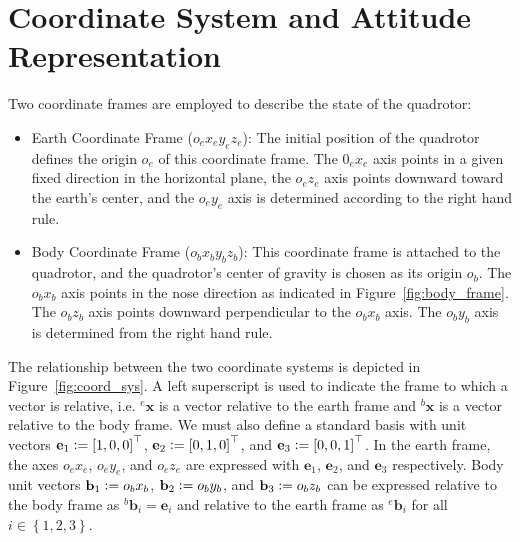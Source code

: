 \documentclass{article}
\author{Philip Renkert}
\date{6/15/2021}
\newcommand{\defeq}{\vcentcolon=}
\begin{document}
 
	\section*{Coordinate System and Attitude Representation}
	Two coordinate frames are employed to describe the state of the quadrotor:
	\begin{itemize}
		\item Earth Coordinate Frame ($o_e x_e y_e z_e$): The initial position of the quadrotor defines the origin $o_e$ of this coordinate frame.  The $0_e x_e$ axis points in a given fixed direction in the horizontal plane, the $o_e z_e$ axis points downward toward the earth's center, and the $o_e y_e$ axis is determined according to the right hand rule.  
		\item Body Coordinate Frame ($o_b x_b y_b z_b$): This coordinate frame is attached to the quadrotor, and the quadrotor's center of gravity is chosen as its origin $o_b$. The $o_bx_b$ axis points in the nose direction as indicated in Figure~\ref{fig:body_frame}.  The $o_b z_b$ axis points downward perpendicular to the $o_b x_b$ axis.  The $o_b y_b$ axis is determined from the right hand rule.  
	\end{itemize}
	
	The relationship between the two coordinate systems is depicted in Figure~\ref{fig:coord_sys}.  A left superscript is used to indicate the frame to which a vector is relative, i.e. ${}^e \mathbf{x}$ is a vector relative to the earth frame and ${}^b \mathbf{x}$ is a vector relative to the body frame.  We must also define a standard basis with unit vectors $\mathbf{e}_1 \defeq \left[1,0,0\right]^\top$, $\mathbf{e}_2 \defeq \left[0,1,0\right]^\top$, and $\mathbf{e}_3 \defeq \left[0,0,1\right]^\top$.  In the earth frame, the axes $o_e x_e$, $o_e y_e$, and $o_e z_e$ are expressed with $\mathbf{e}_1$, $\mathbf{e}_2$, and $\mathbf{e}_3$ respectively. Body unit vectors $\mathbf{b}_1 \defeq o_b x_b$, $\mathbf{b}_2 \defeq o_b y_b$, and $\mathbf{b}_3 \defeq o_b z_b$ can be expressed relative to the body frame as ${}^b \mathbf{b}_i = \mathbf{e}_i$ and relative to the earth frame as ${}^e \mathbf{b}_i$ for all $i \in \left\{1,2,3\right\}$. 
	
\end{document}
